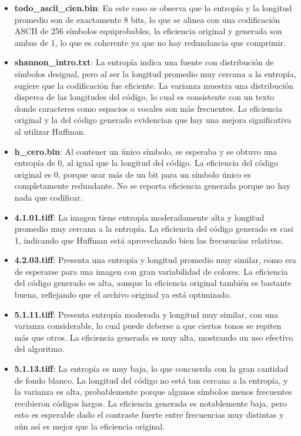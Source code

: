 \documentclass[conference,onecolumn,12pt]{IEEEtran}
\numberwithin{equation}{subsection}
\begin{document}
\begin{itemize}
    \item \textbf{todo\_ascii\_cien.bin}: En este caso se observa que la entropía y la longitud promedio son de exactamente 8 bits, lo que se alinea con una codificación ASCII de 256 símbolos equiprobables, la eficiencia original y generada son ambas de 1, lo que es coherente ya que no hay redundancia que comprimir.
    
    \item \textbf{shannon\_intro.txt}: La entropía indica una fuente con distribución de símbolos desigual, pero al ser la longitud promedio muy cercana a la entropía, sugiere que la codificación fue eficiente. La varianza muestra una distribución dispersa de las longitudes del código, lo cual es consistente con un texto donde caracteres como espacios o vocales son más frecuentes. La eficiencia original y la del código generado evidencian que hay una mejora significativa al utilizar Huffman.
    
    \item \textbf{h\_cero.bin}: Al contener un único símbolo, se esperaba y se obtuvo una entropía de 0, al igual que la longitud del código. La eficiencia del código original es 0, porque usar más de un bit para un símbolo único es completamente redundante. No se reporta eficiencia generada porque no hay nada que codificar.  
    
    \item \textbf{4.1.01.tiff}: La imagen tiene entropía moderadamente alta y longitud promedio muy cercana a la entropía. La eficiencia del código generado es casi 1, indicando que Huffman está aprovechando bien las frecuencias relativas.
    
    \item \textbf{4.2.03.tiff}: Presenta una entropía y longitud promedio muy similar, como era de esperarse para una imagen con gran variabilidad de colores. La eficiencia del código generado es alta, aunque la eficiencia original también es bastante buena, reflejando que el archivo original ya está optimizado.
    
    \item \textbf{5.1.11.tiff}:  Presenta entropía moderada y longitud muy similar, con una varianza considerable, lo cual puede deberse a que ciertos tonos se repiten más que otros. La eficiencia generada es muy alta, mostrando un uso efectivo del algoritmo.
    
    \item \textbf{5.1.13.tiff}: La entropía es muy baja, lo que concuerda con la gran cantidad de fondo blanco. La longitud del código no está tan cercana a la entropía, y la varianza es alta, probablemente porque algunos símbolos menos frecuentes recibieron códigos largos. La eficiencia generada es notablemente baja, pero esto es esperable dado el contraste fuerte entre frecuencias muy distintas y aún así es mejor que la eficiencia original.
    

\end{itemize}
\end{document}
